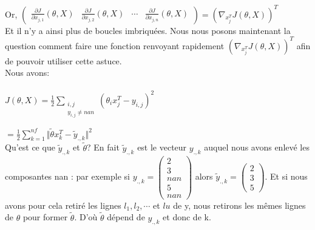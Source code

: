 \documentclass[a4paper,10pt]{article}
\begin{document}
\noindent Or, $\begin{pmatrix}
\frac{\partial J}{\partial x_{j,1}}(\theta, X) & \frac{\partial J}{\partial x_{j,2}}(\theta, X) & \cdots & \frac{\partial J}{\partial x_{j,n}}(\theta, X)
\end{pmatrix}
= (\nabla_{x_{j}^T} J(\theta, X))^{T}$\\

\noindent Et il n'y a ainsi plus de boucles imbriqu\'{e}es. Nous nous posons maintenant la question comment faire une fonction renvoyant rapidement $(\nabla_{x_{j}^T} J(\theta, X))^{T}$ afin de pouvoir utiliser cette astuce.\\

\noindent Nous avons:\\\\
$J(\theta, X)=\frac{1}{2}\displaystyle\sum_{\substack{i,j \\ y_{i,j} \ne nan}}(\theta_{i}x_{j}^{T}-y_{i,j})^{2}$

$=\frac{1}{2}\displaystyle\sum_{k=1}^{nf}\Vert\tilde{\theta}x_{k}^{T}-\tilde{y}_{.,k}\Vert^{2}$\\

\noindent Qu'est ce que $\tilde{y}_{.,k}$ et $\tilde{\theta}$? En fait $\tilde{y}_{.,k}$ est le vecteur $y_{.,k}$ auquel nous avons enlev\'{e} les composantes nan : par exemple si $y_{.,k}=
\begin{pmatrix}
2\\3\\nan\\5\\nan
\end{pmatrix}$
alors $\tilde{y}_{.,k}=
\begin{pmatrix}
2\\3\\5
\end{pmatrix}$. Et si nous avons pour cela retir\'{e} les lignes $l_{1}, l_{2}, \cdots$ et $l{u}$ de y, nous retirons les m\^{e}mes lignes de $\theta$ pour former $\tilde{\theta}$.  D'o\`{u} $\tilde{\theta}$ d\'{e}pend de $y_{.,k}$ et donc de k.\\
\end{document}
